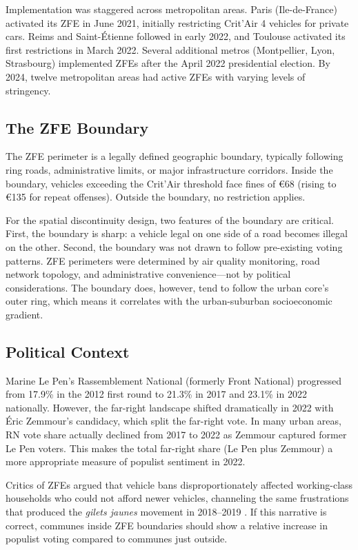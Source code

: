 \documentclass[12pt]{article}
\renewcommand{\EUR}[1]{\euro{}#1}
\begin{document}
Implementation was staggered across metropolitan areas. Paris (Ile-de-France) activated its ZFE in June 2021, initially restricting Crit'Air 4 vehicles for private cars. Reims and Saint-\'{E}tienne followed in early 2022, and Toulouse activated its first restrictions in March 2022. Several additional metros (Montpellier, Lyon, Strasbourg) implemented ZFEs after the April 2022 presidential election. By 2024, twelve metropolitan areas had active ZFEs with varying levels of stringency.

\subsection{The ZFE Boundary}

The ZFE perimeter is a legally defined geographic boundary, typically following ring roads, administrative limits, or major infrastructure corridors. Inside the boundary, vehicles exceeding the Crit'Air threshold face fines of \EUR{68} (rising to \EUR{135} for repeat offenses). Outside the boundary, no restriction applies.

For the spatial discontinuity design, two features of the boundary are critical. First, the boundary is sharp: a vehicle legal on one side of a road becomes illegal on the other. Second, the boundary was not drawn to follow pre-existing voting patterns. ZFE perimeters were determined by air quality monitoring, road network topology, and administrative convenience---not by political considerations. The boundary does, however, tend to follow the urban core's outer ring, which means it correlates with the urban-suburban socioeconomic gradient.

\subsection{Political Context}

Marine Le Pen's Rassemblement National (formerly Front National) progressed from 17.9\% in the 2012 first round to 21.3\% in 2017 and 23.1\% in 2022 nationally. However, the far-right landscape shifted dramatically in 2022 with \'{E}ric Zemmour's candidacy, which split the far-right vote. In many urban areas, RN vote share actually declined from 2017 to 2022 as Zemmour captured former Le Pen voters. This makes the total far-right share (Le Pen plus Zemmour) a more appropriate measure of populist sentiment in 2022.

Critics of ZFEs argued that vehicle bans disproportionately affected working-class households who could not afford newer vehicles, channeling the same frustrations that produced the \textit{gilets jaunes} movement in 2018--2019 \citep{douenne2022yellowvests}. If this narrative is correct, communes inside ZFE boundaries should show a relative increase in populist voting compared to communes just outside.
\end{document}

